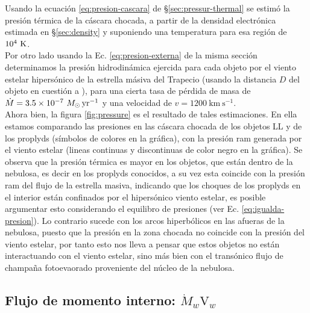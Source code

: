 Usando la ecuación \ref{eq:presion-cascara} de \S\ref{sec:pressur-thermal} se estimó la presión térmica de la cáscara chocada, a partir de la densidad electrónica estimada en \S\ref{sec:density} y suponiendo una temperatura para esa región de \(10^{4}~\mathrm{K}\).\\

 Por otro lado usando la Ec. \ref{eq:presion-externa} de la misma sección determinamos la presión hidrodinámica ejercida para cada objeto por el viento estelar hipersónico de la estrella másiva \thC{} del Trapecio (usando la distancia \(D\) del objeto en cuestión a \thC{}), para una cierta tasa de pérdida de masa de \(\dot{M} = 3.5 \times 10^{-7}~M_\odot\,\mathrm{yr^{-1}}\) y una velocidad de \(v = 1200~\mathrm{km~s^{-1}}\). \\

Ahora bien, la figura \ref{fig:pressure} es el resultado de tales estimaciones. En ella estamos comparando las presiones en las cáscara chocada de los objetos LL y de los proplyds (símbolos de colores en la gráfica), con la presión ram generada por el viento estelar (lineas continuas  y discontinuas  de color  negro en la gráfica). Se observa  que la presión térmica es mayor en los objetos, que están dentro de la nebulosa,  es decir en los proplyds conocidos, a su vez esta  coincide con la presión ram del flujo de la estrella masiva, indicando que los choques de los proplyds en el interior están confinados por el hipersónico viento estelar, es posible argumentar esto considerando el equilibro de presiones (ver Ec. \ref{eq:igualda-presion}). Lo contrario sucede con los arcos hiperbólicos en las afueras de la nebulosa, puesto que la presión en la zona chocada no coincide con la presión del viento estelar, por tanto esto nos lleva a pensar que estos objetos no están interactuando con el viento estelar, sino más bien con el transónico flujo de champaña fotoevaorado proveniente del núcleo de la nebulosa.  

\subsection{Flujo de momento interno: \(\dot{M}_{w}\text{V}_{w}\) }
\label{sec:momentum}

